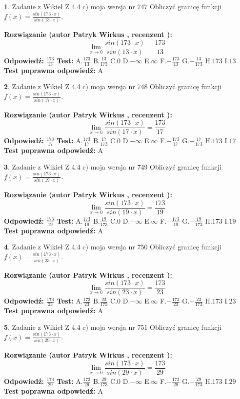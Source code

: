 \documentclass[12pt, a4paper]{article}
\theoremstyle{definition} %
\newtheorem{zad}{}
\newcommand{\zadStart}[1]{\begin{zad}#1\newline}
\newcommand{\zadStop}{\end{zad}}
\newcommand{\rozwStart}[2]{\noindent \textbf{Rozwiązanie (autor #1 , recenzent #2): }\newline}
\newcommand{\rozwStop}{\newline}
\newcommand{\odpStart}{\noindent \textbf{Odpowiedź:}\newline}
\newcommand{\odpStop}{\newline}
\newcommand{\testStart}{\noindent \textbf{Test:}\newline}
\newcommand{\testStop}{\newline}
\newcommand{\kluczStart}{\noindent \textbf{Test poprawna odpowiedź:}\newline}
\newcommand{\kluczStop}{\newline}
\begin{document}
\zadStart{Zadanie z Wikieł Z 4.4 c) moja wersja nr 747}
Obliczyć granicę funkcji $f(x)=\frac{sin(173\cdot x)}{sin(13\cdot x)}$.
\zadStop
\rozwStart{Patryk Wirkus}{}
$$\lim\limits_{x\to 0}\frac{sin(173\cdot x)}{sin(13\cdot x)}=
\frac{173}{13}$$
\rozwStop
\odpStart
$\frac{173}{13}$
\odpStop
\testStart
A.$\frac{173}{13}$
B.$\frac{13}{173}$
C.$0$
D.$-\infty$
E.$\infty$
F.$-\frac{173}{13}$
G.$-\frac{13}{173}$
H.$173$
I.$13$
\testStop
\kluczStart
A
\kluczStop



\zadStart{Zadanie z Wikieł Z 4.4 c) moja wersja nr 748}
Obliczyć granicę funkcji $f(x)=\frac{sin(173\cdot x)}{sin(17\cdot x)}$.
\zadStop
\rozwStart{Patryk Wirkus}{}
$$\lim\limits_{x\to 0}\frac{sin(173\cdot x)}{sin(17\cdot x)}=
\frac{173}{17}$$
\rozwStop
\odpStart
$\frac{173}{17}$
\odpStop
\testStart
A.$\frac{173}{17}$
B.$\frac{17}{173}$
C.$0$
D.$-\infty$
E.$\infty$
F.$-\frac{173}{17}$
G.$-\frac{17}{173}$
H.$173$
I.$17$
\testStop
\kluczStart
A
\kluczStop



\zadStart{Zadanie z Wikieł Z 4.4 c) moja wersja nr 749}
Obliczyć granicę funkcji $f(x)=\frac{sin(173\cdot x)}{sin(19\cdot x)}$.
\zadStop
\rozwStart{Patryk Wirkus}{}
$$\lim\limits_{x\to 0}\frac{sin(173\cdot x)}{sin(19\cdot x)}=
\frac{173}{19}$$
\rozwStop
\odpStart
$\frac{173}{19}$
\odpStop
\testStart
A.$\frac{173}{19}$
B.$\frac{19}{173}$
C.$0$
D.$-\infty$
E.$\infty$
F.$-\frac{173}{19}$
G.$-\frac{19}{173}$
H.$173$
I.$19$
\testStop
\kluczStart
A
\kluczStop



\zadStart{Zadanie z Wikieł Z 4.4 c) moja wersja nr 750}
Obliczyć granicę funkcji $f(x)=\frac{sin(173\cdot x)}{sin(23\cdot x)}$.
\zadStop
\rozwStart{Patryk Wirkus}{}
$$\lim\limits_{x\to 0}\frac{sin(173\cdot x)}{sin(23\cdot x)}=
\frac{173}{23}$$
\rozwStop
\odpStart
$\frac{173}{23}$
\odpStop
\testStart
A.$\frac{173}{23}$
B.$\frac{23}{173}$
C.$0$
D.$-\infty$
E.$\infty$
F.$-\frac{173}{23}$
G.$-\frac{23}{173}$
H.$173$
I.$23$
\testStop
\kluczStart
A
\kluczStop



\zadStart{Zadanie z Wikieł Z 4.4 c) moja wersja nr 751}
Obliczyć granicę funkcji $f(x)=\frac{sin(173\cdot x)}{sin(29\cdot x)}$.
\zadStop
\rozwStart{Patryk Wirkus}{}
$$\lim\limits_{x\to 0}\frac{sin(173\cdot x)}{sin(29\cdot x)}=
\frac{173}{29}$$
\rozwStop
\odpStart
$\frac{173}{29}$
\odpStop
\testStart
A.$\frac{173}{29}$
B.$\frac{29}{173}$
C.$0$
D.$-\infty$
E.$\infty$
F.$-\frac{173}{29}$
G.$-\frac{29}{173}$
H.$173$
I.$29$
\testStop
\kluczStart
A
\kluczStop
\end{document}
